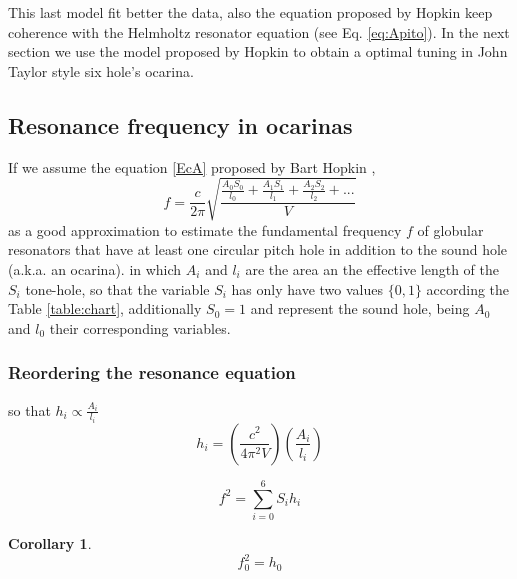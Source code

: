 \documentclass{article}
\newtheorem{corollary}{Corollary}[section]
\begin{document}
This last model fit better the data, 
also the equation proposed by Hopkin keep coherence with the Helmholtz resonator equation (see Eq. \ref{eq:Apito}).
In the next section we use the model proposed by Hopkin to obtain a optimal tuning in 
John Taylor style six hole's ocarina.


\subsection{Resonance frequency in ocarinas}


If we assume the equation \ref{EcA} proposed by Bart Hopkin \cite[pp. 44]{cabreraestudio} \cite{1999air},
\begin{equation} \label{EcA}
 f = \frac{c}{2 \pi} \sqrt{\frac{\frac{A_{0}S_{0}}{l_{0}}+\frac{A_{1}S_{1}}{l_{1}}+\frac{A_{2}S_{2}}{l_{2}}+ . . .}{V} }   
\end{equation}
as a good approximation to estimate the fundamental frequency $f$ 
of globular resonators that have at least one circular pitch hole in addition to the sound hole (a.k.a. an ocarina). 
in which $A_i$ and $l_i$ are the area an the effective length of the $S_i$ tone-hole,
so that the variable $S_i$ has only have two values $\{0,1\}$ according the Table \ref{table:chart},
additionally $S_0=1$ and represent the sound hole, being $A_0$ and $l_0$ their corresponding variables. 



\subsubsection{Reordering the resonance equation}

so that $h_{i}\propto \frac{A_{i}}{l_{i}}$
\begin{equation} \label{EcC}
 h_{i} =  \left( \frac{c^2}{4 {\pi}^2 V}\right) \left( \frac{A_{i}}{l_{i}}    \right) 
\end{equation}

\begin{equation} \label{EcD}
 f^{2} = \sum_{i=0}^{6}{S_i h_i}
\end{equation}

\begin{corollary}

\begin{equation} 
 f_0^{2} = h_0
\end{equation}
 
\end{corollary}
\end{document}
